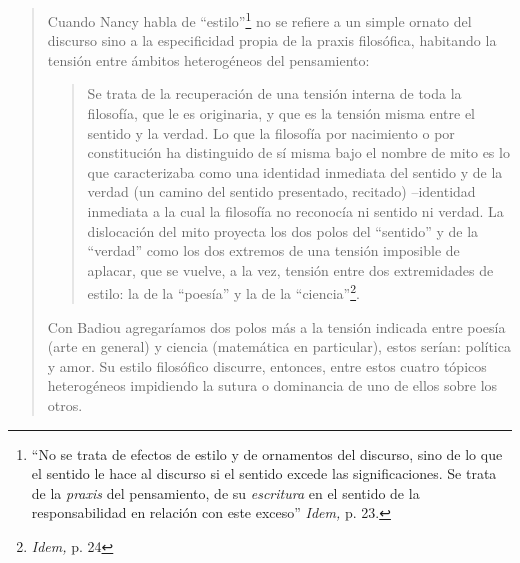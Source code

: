 \begin{quote}
Cuando Nancy habla de \enquote{estilo}\footnote{\enquote{No se trata de efectos de estilo y de ornamentos del discurso, sino de lo que el sentido le hace al discurso si el sentido excede las significaciones. Se trata de la \emph{praxis} del pensamiento, de su \emph{escritura} en el sentido de la responsabilidad en relación con este exceso} \emph{Idem,} p. 23.} no se refiere a un simple ornato del discurso sino a la especificidad propia de la praxis filosófica, habitando la tensión entre ámbitos heterogéneos del pensamiento:

\begin{quote}
Se trata de la recuperación de una tensión interna de toda la filosofía, que le es originaria, y que es la tensión misma entre el sentido y la verdad. Lo que la filosofía por nacimiento o por constitución ha distinguido de sí misma bajo el nombre de mito es lo que caracterizaba como una identidad inmediata del sentido y de la verdad (un camino del sentido presentado, recitado) --identidad inmediata a la cual la filosofía no reconocía ni sentido ni verdad. La dislocación del mito proyecta los dos polos del \enquote{sentido} y de la \enquote{verdad} como los dos extremos de una tensión imposible de aplacar, que se vuelve, a la vez, tensión entre dos extremidades de estilo: la de la \enquote{poesía} y la de la \enquote{ciencia}\footnote{\emph{Idem,} p. 24}.
\end{quote}

Con Badiou agregaríamos dos polos más a la tensión indicada entre poesía (arte en general) y ciencia (matemática en particular), estos serían: política y amor. Su estilo filosófico discurre, entonces, entre estos cuatro tópicos heterogéneos impidiendo la sutura o dominancia de uno de ellos sobre los otros.


\end{quote}
